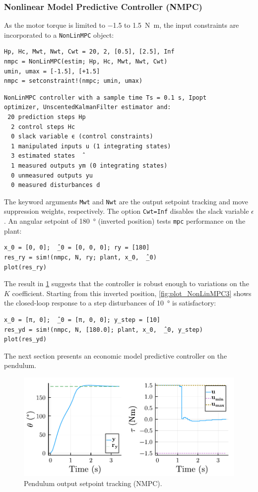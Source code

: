 \subsubsection{Nonlinear Model Predictive Controller (NMPC)}

As the motor torque is limited to \num{-1.5} to \SI{1.5}{\newton\meter}, the input constraints are incorporated to a \texttt{NonLinMPC} object:
\begin{verbatim}
Hp, Hc, Mwt, Nwt, Cwt = 20, 2, [0.5], [2.5], Inf
nmpc = NonLinMPC(estim; Hp, Hc, Mwt, Nwt, Cwt)
umin, umax = [-1.5], [+1.5]
nmpc = setconstraint!(nmpc; umin, umax)
\end{verbatim}
\spacerepl
\begin{verbatim}
NonLinMPC controller with a sample time Ts = 0.1 s, Ipopt
optimizer, UnscentedKalmanFilter estimator and:
 20 prediction steps Hp
  2 control steps Hc
  0 slack variable ϵ (control constraints)
  1 manipulated inputs u (1 integrating states)
  3 estimated states  ̂
  1 measured outputs ym (0 integrating states)
  0 unmeasured outputs yu
  0 measured disturbances d
\end{verbatim}
The keyword arguments \texttt{Mwt} and \texttt{Nwt} are the output setpoint tracking and move suppression weights, respectively. The option \texttt{Cwt=Inf} disables the slack variable $\epsilon$. An angular setpoint of \SI{180}{\degree} (inverted position) tests \texttt{mpc} performance on the plant:
\begin{verbatim}
x_0 = [0, 0];  ̂_0 = [0, 0, 0]; ry = [180]
res_ry = sim!(nmpc, N, ry; plant, x_0,  ̂_0)
plot(res_ry)
\end{verbatim}
The result in \cref{fig:plot_NonLinMPC2} suggests that the controller is robust enough to variations on the $K$ coefficient. Starting from this inverted position, \cref{fig:plot_NonLinMPC3} shows the closed-loop response to a step disturbances of \SI{10}{\degree} is satisfactory:
\begin{verbatim}
x_0 = [π, 0];  ̂_0 = [π, 0, 0]; y_step = [10]
res_yd = sim!(nmpc, N, [180.0]; plant, x_0,  ̂_0, y_step)
plot(res_yd)
\end{verbatim}
The next section presents an economic model predictive controller on the pendulum.

\begin{figure}[ht]
    \centering
    \includegraphics[width=\columnwidth]{fig/plot_NonLinMPC2.pdf}
    \caption{Pendulum output setpoint tracking (NMPC).}\label{fig:plot_NonLinMPC2}
\end{figure}

